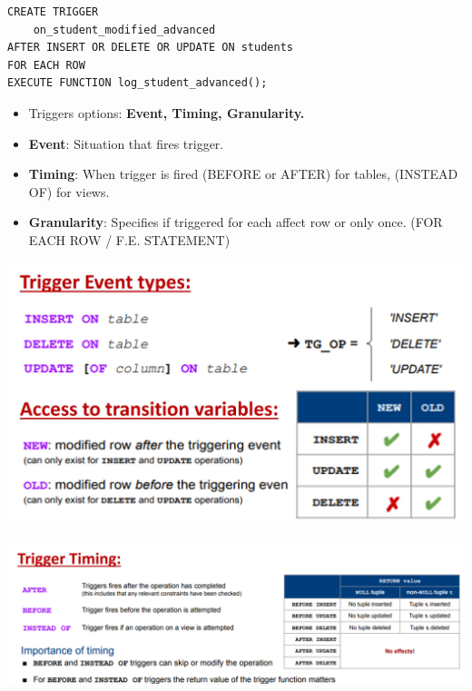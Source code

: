 \documentclass[12pt, landscape]{article}
\begin{document}
\begin{multicols*}{3}
\begin{lstlisting}
CREATE TRIGGER 
    on_student_modified_advanced
AFTER INSERT OR DELETE OR UPDATE ON students
FOR EACH ROW
EXECUTE FUNCTION log_student_advanced();
\end{lstlisting}

\begin{itemize}
\item Triggers options: \textbf{Event, Timing, Granularity.}
\item \textbf{Event}: Situation that fires trigger.
\item \textbf{Timing}: When trigger is fired (BEFORE or AFTER) for tables, (INSTEAD OF) for views.
\item \textbf{Granularity}: Specifies if triggered for each affect row or only once. (FOR EACH ROW / F.E. STATEMENT)
\end{itemize}

\centerline{\includegraphics[width=0.9 \linewidth]{triggerevents}}
\centerline{\includegraphics[width=1 \linewidth]{triggertiming}}


\end{multicols*}
\end{document}
